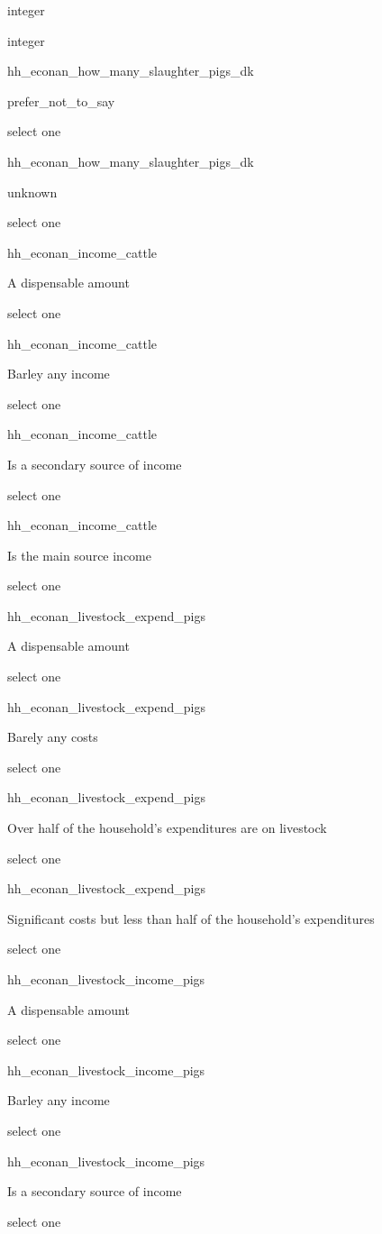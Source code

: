 \documentclass[]{article}
\begin{document}
integer

integer

hh\_econan\_how\_many\_slaughter\_pigs\_dk

prefer\_not\_to\_say

select one

hh\_econan\_how\_many\_slaughter\_pigs\_dk

unknown

select one

hh\_econan\_income\_cattle

A dispensable amount

select one

hh\_econan\_income\_cattle

Barley any income

select one

hh\_econan\_income\_cattle

Is a secondary source of income

select one

hh\_econan\_income\_cattle

Is the main source income

select one

hh\_econan\_livestock\_expend\_pigs

A dispensable amount

select one

hh\_econan\_livestock\_expend\_pigs

Barely any costs

select one

hh\_econan\_livestock\_expend\_pigs

Over half of the household's expenditures are on livestock

select one

hh\_econan\_livestock\_expend\_pigs

Significant costs but less than half of the household's expenditures

select one

hh\_econan\_livestock\_income\_pigs

A dispensable amount

select one

hh\_econan\_livestock\_income\_pigs

Barley any income

select one

hh\_econan\_livestock\_income\_pigs

Is a secondary source of income

select one
\end{document}
